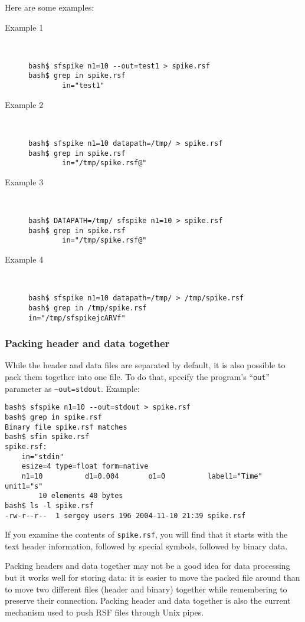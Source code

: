 Here are some examples:
\begin{description}
\item[Example 1] \ \\
\begin{verbatim}
bash$ sfspike n1=10 --out=test1 > spike.rsf
bash$ grep in spike.rsf
        in="test1"
\end{verbatim}
\item[Example 2] \ \\
\begin{verbatim}
bash$ sfspike n1=10 datapath=/tmp/ > spike.rsf
bash$ grep in spike.rsf
        in="/tmp/spike.rsf@"
\end{verbatim}
\item[Example 3] \ \\
\begin{verbatim}
bash$ DATAPATH=/tmp/ sfspike n1=10 > spike.rsf
bash$ grep in spike.rsf
        in="/tmp/spike.rsf@"
\end{verbatim}
\item[Example 4] \ \\
\begin{verbatim}
bash$ sfspike n1=10 datapath=/tmp/ > /tmp/spike.rsf
bash$ grep in /tmp/spike.rsf
in="/tmp/sfspikejcARVf"
\end{verbatim}
\end{description}

\subsubsection{Packing header and data together}

While the header and data files are separated by default, it is also possible
to pack them together into one file. To do that, specify the program's
``\texttt{out}'' parameter as \texttt{--out=stdout}. Example:
\begin{verbatim}
bash$ sfspike n1=10 --out=stdout > spike.rsf
bash$ grep in spike.rsf
Binary file spike.rsf matches
bash$ sfin spike.rsf
spike.rsf:
    in="stdin"
    esize=4 type=float form=native
    n1=10          d1=0.004       o1=0          label1="Time" unit1="s"
        10 elements 40 bytes
bash$ ls -l spike.rsf
-rw-r--r--  1 sergey users 196 2004-11-10 21:39 spike.rsf
\end{verbatim}
If you examine the contents of \texttt{spike.rsf}, you will find that it
starts with the text header information, followed by special
symbols, followed by binary data. 

Packing headers and data together may not be a good idea for data processing
but it works well for storing data: it is easier to move the packed file
around than to move two different files (header and binary) together while
remembering to preserve their connection. Packing header and data together is
also the current mechanism used to push RSF files through Unix pipes.

